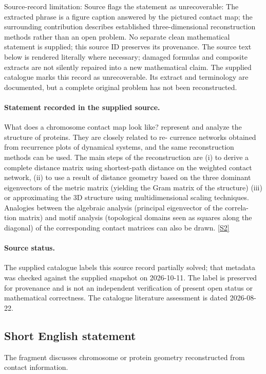 \documentclass[11pt]{article}
\begin{document}
Source-record limitation: Source flags the statement as unrecoverable: The extracted phrase is a figure caption answered by the pictured contact map; the surrounding contribution describes established three-dimensional reconstruction methods rather than an open problem. No separate clean mathematical statement is supplied; this source ID preserves its provenance.
The source text below is rendered literally where necessary; damaged formulas and composite extracts are not silently repaired into a new mathematical claim.
The supplied catalogue marks this record as unrecoverable. Its extract and terminology are documented, but a complete original problem has not been reconstructed.
\paragraph{Statement recorded in the supplied source.}
What does a chromosome contact map look like? represent and analyze the structure of proteins. They are closely related to re- currence networks obtained from recurrence plots of dynamical systems, and the same reconstruction methods can be used. The main steps of the reconstruction are (i) to derive a complete distance matrix using shortest-path distance on the weighted contact network, (ii) to use a result of distance geometry based on the three dominant eigenvectors of the metric matrix (yielding the Gram matrix of the structure) (iii) or approximating the 3D structure using multidimensional scaling techniques. Analogies between the algebraic analysis (principal eigenvector of the correla- tion matrix) and motif analysis (topological domains seen as squares along the diagonal) of the corresponding contact matrices can also be drawn. \href{https://doi.org/10.4171/owr/2023/20}{[S2]}
\paragraph{Source status.}
The supplied catalogue labels this source record partially solved; that metadata was checked against the supplied snapshot on 2026-10-11. The label is preserved for provenance and is not an independent verification of present open status or mathematical correctness. The catalogue literature assessment is dated 2026-08-22.
\subsection{Short English statement}
The fragment discusses chromosome or protein geometry reconstructed from contact information.
\end{document}
